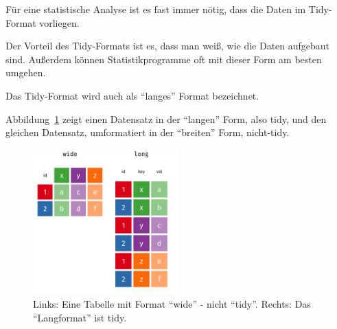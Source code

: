 \documentclass[
  a4paper,
  DIV=11]{scrreprt}
\theoremstyle{definition}
\theoremstyle{definition}
\theoremstyle{remark}
\begin{document}
\begin{tcolorbox}[enhanced jigsaw, titlerule=0mm, bottomrule=.15mm, opacitybacktitle=0.6, colframe=quarto-callout-important-color-frame, title=\textcolor{quarto-callout-important-color}{\faExclamation}\hspace{0.5em}{Wichtig}, coltitle=black, colback=white, arc=.35mm, breakable, toptitle=1mm, opacityback=0, bottomtitle=1mm, left=2mm, leftrule=.75mm, rightrule=.15mm, toprule=.15mm, colbacktitle=quarto-callout-important-color!10!white]

Für eine statistische Analyse ist es fast immer nötig, dass die Daten im
Tidy-Format vorliegen.

\end{tcolorbox}

Der Vorteil des Tidy-Formats ist es, dass man weiß, wie die Daten
aufgebaut sind. Außerdem können Statistikprogramme oft mit dieser Form
am besten umgehen.

Das Tidy-Format wird auch als ``langes'' Format bezeichnet.

Abbildung~\ref{fig-long-wide-anim} zeigt einen Datensatz in der
``langen'' Form, also tidy, und den gleichen Datensatz, umformatiert in
der ``breiten'' Form, nicht-tidy.

\begin{figure}

{\centering \includegraphics[width=0.5\textwidth,height=\textheight]{./img/long-wide-anim.png}

}

\caption{\label{fig-long-wide-anim}Links: Eine Tabelle mit Format
``wide'' - nicht ``tidy''. Rechts: Das ``Langformat'' ist tidy.}

\end{figure}
\end{document}
